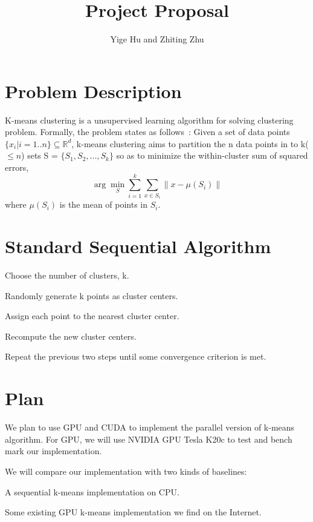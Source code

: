 \documentclass{article}
\begin{document}
\title{Project Proposal}
\author{Yige Hu and Zhiting Zhu}
\date{}
\maketitle

\section{Problem Description}
K-means clustering is a unsupervised learning algorithm for solving clustering
problem. Formally, the problem states
as follows~\cite{wiki}: Given a set of data points $\{x_i|i = 1..n\} \subseteq \mathbb{R}^d $, k-means clustering aims to partition the n data points
in to k($\leq n$) sets S = $\{S_1, S_2, ..., S_k\}$ so as to minimize
the within-cluster sum of squared
errors, $$\arg\min_{S}\sum_{i=1}^{k}\sum_{x \in S_i} \parallel x -
\mu(S_i)\parallel$$ where $\mu(S_i)$ is the mean of points in $S_i$. 

\section{Standard Sequential Algorithm}
\begin{compactitem}
\item{Choose the number of clusters, k.}
\item{Randomly generate k points as cluster centers.}
\item{Assign each point to the nearest cluster center.}
\item{Recompute the new cluster centers.}
\item{Repeat the previous two steps until some convergence criterion
  is met.}
\end{compactitem}

\section{Plan}
We plan to use GPU and CUDA to implement the parallel version of
k-means algorithm. For GPU, we will use NVIDIA GPU Tesla K20c to test
and bench mark our implementation. 

We will compare our implementation with two kinds of baselines:
\begin{compactitem}
\item{A sequential k-means implementation on CPU.}
\item{Some existing GPU k-means implementation we find on the Internet\cite{serban-kmeans, gpuminer}.
}
\end{compactitem}



  
\end{document}

